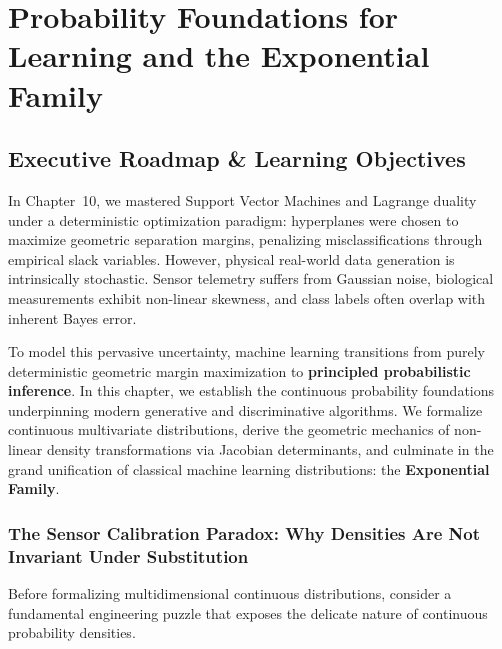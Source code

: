 \chapter[Probability Foundations \& Exponential Family]{Probability Foundations for Learning and the Exponential Family}
\label{chap:week11}

\section{Executive Roadmap \& Learning Objectives}

\begin{tcolorbox}[
    colback=primarylight!30,
    colframe=primarydark,
    title={\large \textbf{Architectural Bridge: From Geometric Margin Bounds to Latent Likelihoods}},
    fonttitle=\bfseries\sffamily,
    arc=3mm,
    boxrule=1pt,
    width=\textwidth
]
In Chapter~10, we mastered Support Vector Machines and Lagrange duality under a deterministic optimization paradigm: hyperplanes were chosen to maximize geometric separation margins, penalizing misclassifications through empirical slack variables. However, physical real-world data generation is intrinsically stochastic. Sensor telemetry suffers from Gaussian noise, biological measurements exhibit non-linear skewness, and class labels often overlap with inherent Bayes error. 

To model this pervasive uncertainty, machine learning transitions from purely deterministic geometric margin maximization to \textbf{principled probabilistic inference}. In this chapter, we establish the continuous probability foundations underpinning modern generative and discriminative algorithms. We formalize continuous multivariate distributions, derive the geometric mechanics of non-linear density transformations via Jacobian determinants, and culminate in the grand unification of classical machine learning distributions: the \textbf{Exponential Family}.
\end{tcolorbox}

\subsection{The Sensor Calibration Paradox: Why Densities Are Not Invariant Under Substitution}
Before formalizing multidimensional continuous distributions, consider a fundamental engineering puzzle that exposes the delicate nature of continuous probability densities.

